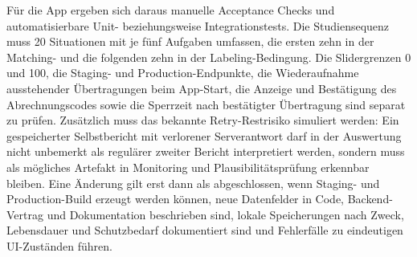 Für die App ergeben sich daraus manuelle Acceptance Checks und automatisierbare Unit- beziehungsweise Integrationstests. Die Studiensequenz muss 20 Situationen mit je fünf Aufgaben umfassen, die ersten zehn in der Matching- und die folgenden zehn in der Labeling-Bedingung. Die Slidergrenzen 0 und 100, die Staging- und Production-Endpunkte, die Wiederaufnahme ausstehender Übertragungen beim App-Start, die Anzeige und Bestätigung des Abrechnungscodes sowie die Sperrzeit nach bestätigter Übertragung sind separat zu prüfen. Zusätzlich muss das bekannte Retry-Restrisiko simuliert werden: Ein gespeicherter Selbstbericht mit verlorener Serverantwort darf in der Auswertung nicht unbemerkt als regulärer zweiter Bericht interpretiert werden, sondern muss als mögliches Artefakt in Monitoring und Plausibilitätsprüfung erkennbar bleiben. Eine Änderung gilt erst dann als abgeschlossen, wenn Staging- und Production-Build erzeugt werden können, neue Datenfelder in Code, Backend-Vertrag und Dokumentation beschrieben sind, lokale Speicherungen nach Zweck, Lebensdauer und Schutzbedarf dokumentiert sind und Fehlerfälle zu eindeutigen UI-Zuständen führen.

